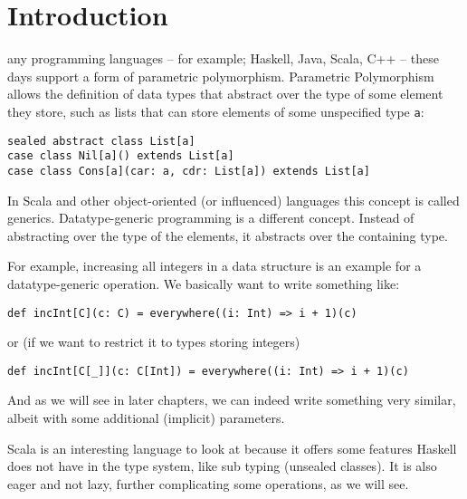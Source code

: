 \chapter{Introduction}
any programming languages -- for example; Haskell, Java, Scala, C++ --
these days support a form of parametric polymorphism.
Parametric Polymorphism allows the definition of data types that abstract over
the type of some element they store, such as lists that can store elements of
some unspecified type \lstinline{a}:
\begin{lstlisting}
sealed abstract class List[a]
case class Nil[a]() extends List[a]
case class Cons[a](car: a, cdr: List[a]) extends List[a]
\end{lstlisting}
In Scala and other object-oriented (or influenced) languages this concept is
called generics.
Datatype-generic programming is a different concept. Instead of abstracting
over the type of the elements, it abstracts over the containing type.

For example, increasing all integers in a data structure is an example for a
datatype-generic operation. We basically want to write something like:
\begin{lstlisting}
def incInt[C](c: C) = everywhere((i: Int) => i + 1)(c)
\end{lstlisting}
or (if we want to restrict it to types storing integers)
\begin{lstlisting}
def incInt[C[_]](c: C[Int]) = everywhere((i: Int) => i + 1)(c)
\end{lstlisting}
And as we will see in later chapters, we can indeed write something very similar,
albeit with some additional (implicit) parameters.

Scala is an interesting language to look at because it offers some features Haskell
does not have in the type system, like sub typing (unsealed classes). It is also
eager and not lazy, further complicating some operations, as we will see.

